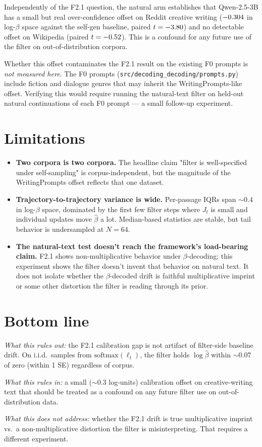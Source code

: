 \documentclass[11pt]{article}
\begin{document}
Independently of the F2.1 question, the natural arm establishes that Qwen-2.5-3B
has a small but real over-confidence offset on Reddit creative writing
($-0.304$ in log-$\beta$ space against the self-gen baseline, paired
$t = -3.80$) and no detectable offset on Wikipedia
(paired $t = -0.52$).
This is a confound for any future use of the filter on out-of-distribution
corpora.

Whether this offset contaminates the F2.1 result on the existing F0 prompts is
\emph{not measured here}.
The F0 prompts (\texttt{src/decoding\_decoding/prompts.py}) include fiction and
dialogue genres that may inherit the WritingPrompts-like offset.
Verifying this would require running the natural-text filter on held-out natural
continuations of each F0 prompt --- a small follow-up experiment.

\section{Limitations}

\begin{itemize}
\item \textbf{Two corpora is two corpora.}
The headline claim "filter is well-specified under self-sampling" is corpus-independent,
but the magnitude of the WritingPrompts offset reflects that one dataset.

\item \textbf{Trajectory-to-trajectory variance is wide.}
Per-passage IQRs span $\sim 0.4$ in log-$\beta$ space, dominated by the
first few filter steps where $J_t$ is small and individual updates move
$\hat\beta$ a lot.
Median-based statistics are stable, but tail behavior is undersampled at $N=64$.

\item \textbf{The natural-text test doesn't reach the framework's load-bearing claim.}
F2.1 shows non-multiplicative behavior under $\beta$-decoding; this experiment
shows the filter doesn't invent that behavior on natural text.
It does not isolate whether the $\beta$-decoded drift is faithful multiplicative
imprint or some other distortion the filter is reading through its prior.
\end{itemize}

\section{Bottom line}

\textit{What this rules out:}
the F2.1 calibration gap is not artifact of filter-side baseline drift.
On i.i.d.\ samples from $\mathrm{softmax}(\ell_t)$, the filter holds
$\log\hat\beta$ within $\sim 0.07$ of zero (within 1 SE) regardless of corpus.

\textit{What this rules in:}
a small ($\sim 0.3$ log-units) calibration offset on creative-writing text that
should be treated as a confound on any future filter use on out-of-distribution
data.

\textit{What this does not address:}
whether the F2.1 drift is true multiplicative imprint vs.\ a non-multiplicative
distortion the filter is misinterpreting.
That requires a different experiment.
\end{document}
